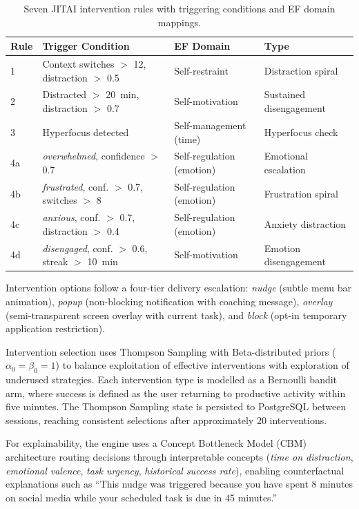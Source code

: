 \begin{table}[htbp]
  \centering
  \caption{Seven JITAI intervention rules with triggering conditions and EF domain mappings.}
  \label{tab:jitai-rules}
  \begin{tabular}{@{}lp{5.2cm}ll@{}}
    \toprule
    \textbf{Rule} & \textbf{Trigger Condition} & \textbf{EF Domain} & \textbf{Type} \\
    \midrule
    1  & Context switches $>$ 12, distraction $>$ 0.5 & Self-restraint & Distraction spiral \\
    2  & Distracted $>$ 20~min, distraction $>$ 0.7 & Self-motivation & Sustained disengagement \\
    3  & Hyperfocus detected & Self-management (time) & Hyperfocus check \\
    4a & \emph{overwhelmed}, confidence $>$ 0.7 & Self-regulation (emotion) & Emotional escalation \\
    4b & \emph{frustrated}, conf. $>$ 0.7, switches $>$ 8 & Self-regulation (emotion) & Frustration spiral \\
    4c & \emph{anxious}, conf. $>$ 0.7, distraction $>$ 0.4 & Self-regulation (emotion) & Anxiety distraction \\
    4d & \emph{disengaged}, conf. $>$ 0.6, streak $>$ 10~min & Self-motivation & Emotion disengagement \\
    \bottomrule
  \end{tabular}
\end{table}

Intervention options follow a four-tier delivery escalation: \emph{nudge} (subtle menu bar animation), \emph{popup} (non-blocking notification with coaching message), \emph{overlay} (semi-transparent screen overlay with current task), and \emph{block} (opt-in temporary application restriction).

Intervention selection uses Thompson Sampling with Beta-distributed priors ($\alpha_0 = \beta_0 = 1$) to balance exploitation of effective interventions with exploration of underused strategies. Each intervention type is modelled as a Bernoulli bandit arm, where success is defined as the user returning to productive activity within five minutes. The Thompson Sampling state is persisted to PostgreSQL between sessions, reaching consistent selections after approximately 20 interventions.

For explainability, the engine uses a Concept Bottleneck Model (CBM) architecture \cite{koh2020} routing decisions through interpretable concepts (\emph{time on distraction}, \emph{emotional valence}, \emph{task urgency}, \emph{historical success rate}), enabling counterfactual explanations such as ``This nudge was triggered because you have spent 8 minutes on social media while your scheduled task is due in 45 minutes.''

